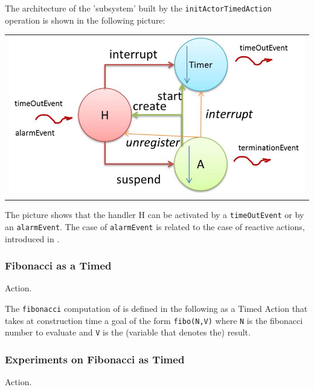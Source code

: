 The architecture of the 'subsystem' built by the \texttt{initActorTimedAction} operation is shown in the following picture:

\begin{center}
\begin{tabular}{ c }
     \includegraphics[scale = 0.7]{img/actionTimedReactive.jpg}\\
\end{tabular}{   }
\end{center}

The picture shows that the handler H can be activated  by a \texttt{timeOutEvent} or by an \texttt{alarmEvent}. The case of \texttt{alarmEvent} is related to the case of reactive actions, introduced in  .

\subsubsection{Fibonacci as a Timed} Action.

The \texttt{fibonacci} computation of  is defined in the following as a Timed Action that takes at construction time a goal of the form \texttt{fibo(N,V)} where \texttt{N} is the fibonacci number to evaluate and \texttt{V} is the (variable that denotes the) result.



\subsubsection{Experiments on Fibonacci as Timed} Action.\\

